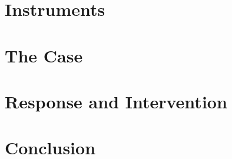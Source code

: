 \documentclass[11pt,openany]{book}
\theoremstyle{definition}
\theoremstyle{remark}
\begin{document}
\part{Instruments}




\part{The Case}



\part{Response and Intervention}



\part{Conclusion}


\appendix


\backmatter

\end{document}
